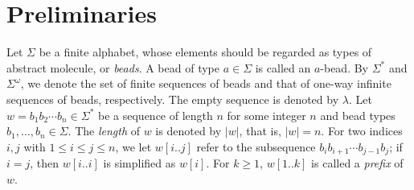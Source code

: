 \documentclass[twocolumn]{svjour3}
\begin{document}
	\section{Preliminaries}\label{sect:preliminaries}


Let $\Sigma$ be a finite alphabet, whose elements should be regarded as types of abstract molecule, or \textit{beads}. 
A bead of type $a \in \Sigma$ is called an $a$-bead. 
By $\Sigma^*$ and $\Sigma^\omega$, we denote the set of finite sequences of beads and that of one-way infinite sequences of beads, respectively. 
The empty sequence is denoted by $\lambda$. 
Let $w = b_1 b_2 \cdots b_n \in \Sigma^*$ be a sequence of length $n$ for some integer $n$ and bead types $b_1, \ldots, b_n \in \Sigma$. 
The \textit{length} of $w$ is denoted by $|w|$, that is, $|w| = n$. %
For two indices $i, j$ with $1 \le i \le j \le n$, we let $w[i..j]$ refer to the subsequence $b_i b_{i+1} \cdots b_{j-1}b_j$; if $i = j$, then $w[i..i]$ is simplified as $w[i]$. 
For $k \ge 1$, $w[1..k]$ is called a \textit{prefix} of $w$. 
\end{document}
